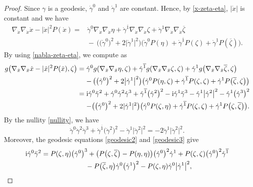 \documentclass[pdftex]{sigma}
\newcommand\ol{\overline}
\numberwithin{equation}{section}
\begin{document}
\begin{proof}
Since $\gamma$ is a geodesic, $\dot\gamma^0$ and $\dot\gamma^1$ are constant.
Hence, by \eqref{x-zeta-eta}, $|\dot x|$ is constant and we have
\begin{align*}
\nabla_{\dot x}\nabla_{\dot x}\dot x-|\dot x|^2P(\dot x)
=&\dot\gamma^0\nabla_{\dot x}\nabla_{\dot x}\eta+
\dot\gamma^{\ol1}\nabla_{\dot x}\nabla_{\dot x}\zeta+\dot\gamma^1\nabla_{\dot x}\nabla_{\dot x}\ol\zeta \\
&{}{-}\,\bigl(\bigl(\dot\gamma^0\bigr)^2+2\bigl|\dot\gamma^1\bigr|^2\bigr)\bigl(\dot\gamma^0P(\eta)+\dot\gamma^{\ol1}P(\zeta)+\dot\gamma^1P(\ol\zeta)\bigr).
\end{align*}
By using \eqref{nabla-zeta-eta}, we compute as
\begin{align*}
g\bigl(\nabla_{\dot x}\nabla_{\dot x}\dot x-|\dot x|^2P(\dot x) ,\zeta\bigr)
={}&\dot\gamma^0g(\nabla_{\dot x}\nabla_{\dot x}\eta, \zeta)+
\dot\gamma^{\ol1}g(\nabla_{\dot x}\nabla_{\dot x}\zeta, \zeta)+\dot\gamma^1g\bigl(\nabla_{\dot x}\nabla_{\dot x}\ol\zeta, \zeta\bigr) \\
&{}{-}\,\bigl(\bigl(\dot\gamma^0\bigr)^2+2\bigl|\dot\gamma^1\bigr|^2\bigr)\bigl(\dot\gamma^0P(\eta, \zeta)+\dot\gamma^{\ol1}P(\zeta, \zeta)+\dot\gamma^1P\bigl(\ol\zeta, \zeta\bigr)\bigr) \\
={}&{\rm i}\dot\gamma^0\ddot\gamma^2+\dot\gamma^0\dot\gamma^2\dot\gamma^3+\dot\gamma^{\ol1}\bigl(\dot\gamma^2\bigr)^2
-{\rm i}\dot\gamma^1\ddot\gamma^3-\dot\gamma^1\bigl|\dot\gamma^2\bigr|^2-\dot\gamma^1\bigl(\dot\gamma^3\bigr)^2 \\
&{}{-}\bigl(\bigl(\dot\gamma^0\bigr)^2+2|\dot\gamma^1|^2\bigr)\bigl(\dot\gamma^0P(\zeta, \eta)+\dot\gamma^{\ol1}P(\zeta, \zeta)+\dot\gamma^1P\bigl(\zeta, \ol\zeta\bigr)\bigr).
\end{align*}
By the nullity \eqref{nullity}, we have
\[
\dot\gamma^0\dot\gamma^2\dot\gamma^3+\dot\gamma^{\ol1}\bigl(\dot\gamma^2\bigr)^2 -\dot\gamma^1\bigl|\dot\gamma^2\bigr|^2=-2\dot\gamma^1\bigl|\dot\gamma^2\bigr|^2.
\]
Moreover, the geodesic equations \eqref{geodesic2} and \eqref{geodesic3} give
\begin{gather*}
{\rm i}\dot\gamma^0\ddot\gamma^2=P(\zeta, \eta)\bigl(\dot\gamma^0\bigr)^3+\bigl(P\bigl(\zeta, \ol\zeta\bigr)-P(\eta, \eta)\bigr)\bigl(\dot\gamma^0\bigr)^2\dot\gamma^1+P(\zeta, \zeta) \bigl(\dot\gamma^0\bigr)^2\dot\gamma^{\ol1} \\
\hphantom{{\rm i}\dot\gamma^0\ddot\gamma^2=}{}
-P\bigl(\ol\zeta, \eta\bigr)\dot\gamma^0\bigl(\dot\gamma^1\bigr)^2-P(\zeta, \eta)\dot\gamma^0\bigl|\dot\gamma^1\bigr|^2, \\

\end{gather*}
\end{proof}
\end{document}
